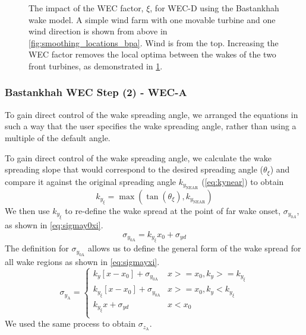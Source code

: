 \documentclass{jpconf}
\begin{document}
\begin{figure}[h!]
\begin{subfigure}[t]{0.47\textwidth}
		\caption{}
		\label{fig:smoothing_bpa_wec_d}
	\end{subfigure}
	\caption{The impact of the WEC factor, $\xi$, for WEC-D using the Bastankhah wake model. A simple wind farm with one movable turbine and one wind direction is shown from above in \cref{fig:smoothing_locations_bpa}. Wind is from the top. Increasing the WEC factor removes the local optima between the wakes of the two front turbines, as demonstrated in \cref{fig:smoothing_bpa_wec_d}.}
	\label{fig:wec_bpa_wec_d}
\end{figure}

\subsubsection{Bastankhah WEC Step (2) - WEC-A}
To gain direct control of the wake spreading angle, we arranged the equations in such a way that the user specifies the wake spreading angle, rather than using a multiple of the default angle. 

To gain direct control of the wake spreading angle, we calculate the wake spreading slope that would correspond to the desired spreading angle ($\theta_\xi$) and compare  it against the original spreading angle $k_{y_{\text{NEAR}}}$ (\cref{eq:kynear}) to obtain
%
\begin{equation}
	k_{y_{\xi}} = \max(\tan{(\theta_\xi)}, k_{y_{\text{NEAR}}})
\end{equation}
%
We then use $k_{y_{\xi}}$ to re-define the wake spread at the point of far wake onset, $\sigma_{y_{0A}}$, as shown in \cref{eq:sigmay0xi}.
%
\begin{equation}\label{eq:sigmay0xi}
	\sigma_{y_{0\text{A}}} = k_{y_{\xi}}x_0+\sigma_{yd}
\end{equation}
%
The definition for $\sigma_{y_{0\text{A}}}$ allows us to define the general form of the wake spread for all wake regions as shown in \cref{eq:sigmayxi}. 
%
\begin{equation}\label{eq:sigmayxi}
	\sigma_{y_{\text{A}}} =
	\begin{cases} k_y [x-x_0]+\sigma_{y_{0\text{A}}} & x >= x_0, k_y >= k_{y_{\xi}} \\
		k_{y_{\xi}} [x-x_0]+\sigma_{y_{0\text{A}}} & x >= x_0, k_y < k_{y_{\xi}} \\
		k_{y_{\xi}}x+\sigma_{yd} & x < x_0 \\
	\end{cases}
\end{equation}
%
We used the same process to obtain $\sigma_{z_{\text{A}}}$. 
\end{document}
